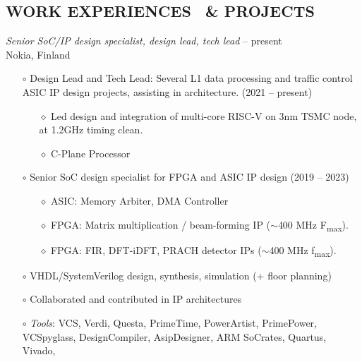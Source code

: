 \documentclass[margin , 10pt]{res} %
\renewcommand{\headrulewidth}{0.3pt}
\begin{document}
\begin{resume}
		\section{WORK EXPERIENCES \ \& PROJECTS}
		
		{\sl  Senior SoC/IP design specialist, design lead, tech lead }  -- present\\
		Nokia, Finland \vspace{3mm}
		\begin{itemize}
			\item[$\circ$] Design Lead and Tech Lead: Several L1 data processing and traffic control ASIC IP design projects, assisting in architecture. (2021 -- present)
			\begin{itemize}
			\item [$\diamond$]Led design and integration of multi-core RISC-V on 3nm TSMC node, at 1.2GHz timing clean.
			\item [$\diamond$]C-Plane Processor
			
			\end{itemize}
			\item[$\circ$] Senior SoC design specialist for FPGA and ASIC IP design (2019 -- 2023)
			\begin{itemize}
				\item[$\diamond$] ASIC: Memory Arbiter, DMA Controller 
				\item[$\diamond$] FPGA: Matrix multiplication / beam-forming IP ($\sim$400 MHz F\textsubscript{max}).
				\item[$\diamond$] FPGA: FIR, DFT-iDFT, PRACH detector IPs ($\sim$400 MHz f\textsubscript{max}).
			\end{itemize}
			
			\item[$\circ$] VHDL/SystemVerilog design, synthesis, simulation (+ floor planning)
			\item[$\circ$] Collaborated and contributed in IP architectures
			\item [$\circ$]\textit{Tools}: VCS, Verdi, Questa, PrimeTime, PowerArtist, PrimePower, VCSpyglass, DesignCompiler, AsipDesigner, ARM SoCrates, Quartus, Vivado, 
		\end{itemize}
		

\end{resume}
\end{document}
